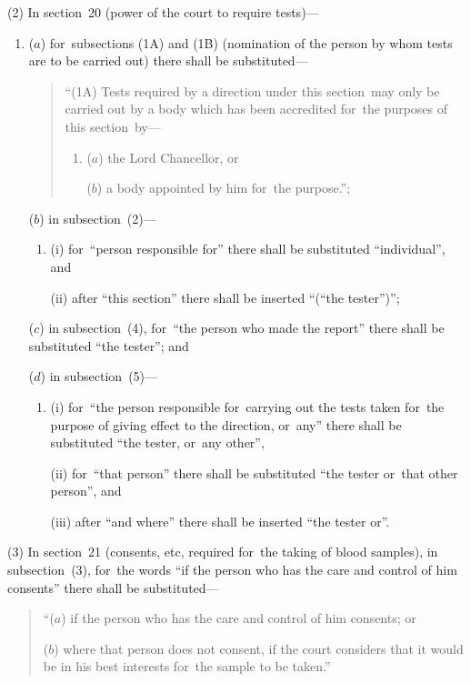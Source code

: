 \documentclass[12pt,a4paper]{article}
\begin{document}
(2) In section~20 (power of the court to require tests)—
\begin{enumerate}\item[]
($a$) for~subsections (1A)  and (1B)  (nomination of the person by whom tests are to be carried out) there shall be substituted—
\begin{quotation}
“(1A) Tests required by a direction under this section~may only be carried out by a body which has been accredited for~the purposes of this section~by—
\begin{enumerate}\item[]
($a$) the Lord Chancellor, or

($b$) a body appointed by him for~the purpose.”;
\end{enumerate}
\end{quotation}

($b$) in subsection~(2)—
\begin{enumerate}\item[]
(i) for~“person responsible for” there shall be substituted “individual”, and

(ii) after “this section” there shall be inserted “(“the tester”)”;
\end{enumerate}

($c$) in subsection~(4), for~“the person who made the report” there shall be substituted “the tester”; and

($d$) in subsection~(5)—
\begin{enumerate}\item[]
(i) for~“the person responsible for~carrying out the tests taken for~the purpose of giving effect to the direction, or~any” there shall be substituted “the tester, or~any other”,

(ii) for~“that person” there shall be substituted “the tester or~that other person”, and

(iii) after “and where” there shall be inserted “the tester or”.
\end{enumerate}
\end{enumerate}

(3) In section~21 (consents, etc, required for~the taking of blood samples), in subsection~(3), for~the words “if the person who has the care and control of him consents” there shall be substituted—
\begin{quotation}
“($a$) if the person who has the care and control of him consents; or

($b$) where that person does not consent, if the court considers that it would be in his best interests for~the sample to be taken.”
\end{quotation}
\end{document}
